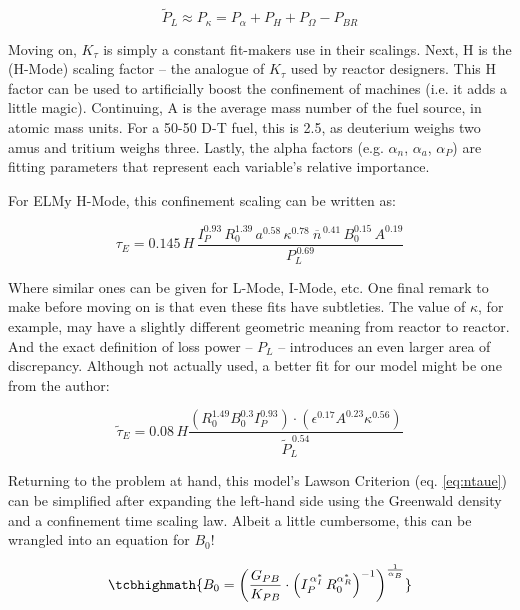\begin{equation}
	\tilde P_L \approx P_\kappa = P_\alpha + P_H + P_\Omega - P_{BR}
\end{equation}

Moving on, $K_\tau$ is simply a constant fit-makers use in their scalings. Next, H is the (H-Mode) scaling factor -- the analogue of $K_\tau$ used by reactor designers. This H factor can be used to artificially boost the confinement of machines (i.e. it adds a little magic). Continuing, A is the average mass number of the fuel source, in atomic mass units. For a 50-50 D-T fuel, this is 2.5, as deuterium weighs two amus and tritium weighs three. Lastly, the alpha factors (e.g. $\alpha_n$, $\alpha_a$, $\alpha_P$) are fitting parameters that represent each variable's relative importance. 

For ELMy H-Mode, this confinement scaling can be written as:

\begin{equation}
	\tau_E = 0.145 \, H \, \frac{
		I_P^{0.93} \, R_0^{1.39} \, a^{0.58} \, \kappa^{0.78} \ \overline{n}^{\, 0.41} \, B_0^{0.15} \, A^{0.19}
	}{ P_L ^ {\,0.69} }
	\label{eq:tau_h}
\end{equation}

Where similar ones can be given for L-Mode, I-Mode, etc. One final remark to make before moving on is that even these fits have subtleties. The value of $\kappa$, for example, may have a slightly different geometric meaning from reactor to reactor. And the exact definition of loss power -- $P_L$ -- introduces an even larger area of discrepancy.  Although not actually used, a better fit for our model might be one from the author:

\begin{equation}
	\tilde \tau_E = 0.08 \, H \frac{  
		\left( R_0^{1.49} B_0 ^ {0.3} I_P^{0.93} \right) \cdot \left( \epsilon ^ {0.17} A^{0.23}  \kappa ^ {0.56} \right) }{ \tilde P_L ^ {\, 0.54} }	
\end{equation}

Returning to the problem at hand, this model's Lawson Criterion (eq. \ref{eq:ntaue}) can be simplified after expanding the left-hand side using the Greenwald density and a confinement time scaling law. Albeit a little cumbersome, this can be wrangled into an equation for $B_0$!

\begin{equation}
	\label{eq:b_0_power}
	\tcbhighmath{
	B_0 = \left( \frac{ G_{PB} }{ K_{PB} } \cdot \left( I_P^{\,\alpha_I^*} \, R_0^{ \alpha_R^* } \right)^{-1} \right) ^ { \frac{1}{ \alpha_B } }
	}
\end{equation}

